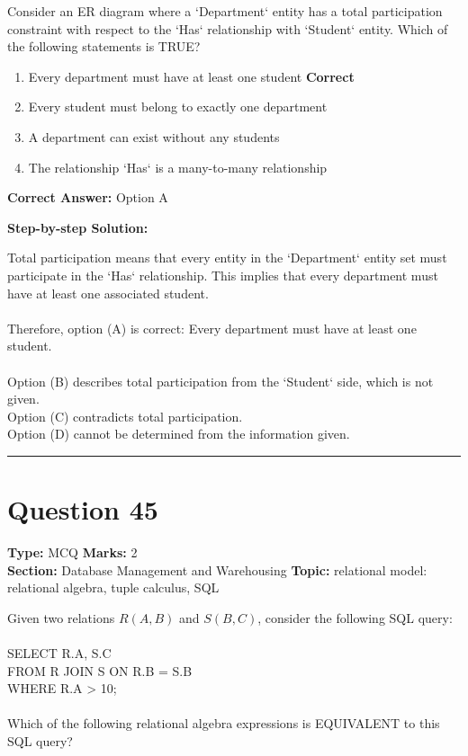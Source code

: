 \documentclass[11pt]{article}
\begin{document}
Consider an ER diagram where a `Department` entity has a total participation constraint with respect to the `Has` relationship with `Student` entity. Which of the following statements is TRUE?


\begin{enumerate}[label=\textbf{\Alph*.}, leftmargin=1.8em]
\item Every department must have at least one student \hfill {\color{gategreen}\textbf{Correct}}\item Every student must belong to exactly one department\item A department can exist without any students\item The relationship `Has` is a many-to-many relationship\end{enumerate}

\textbf{Correct Answer:} Option A

\textbf{Step-by-step Solution:}

Total participation means that every entity in the `Department` entity set must participate in the `Has` relationship. This implies that every department must have at least one associated student.\\
\\
Therefore, option (A) is correct: Every department must have at least one student.\\
\\
Option (B) describes total participation from the `Student` side, which is not given.\\
Option (C) contradicts total participation.\\
Option (D) cannot be determined from the information given.

\vspace{0.8em}
\hrule
\vspace{0.4em}
\section*{Question 45}
\textbf{Type:} MCQ \hfill \textbf{Marks:} 2\\
\textbf{Section:} Database Management and Warehousing \hfill \textbf{Topic:} relational model: relational algebra, tuple calculus, SQL

Given two relations \(R(A, B)\) and \(S(B, C)\), consider the following SQL query:\\
\\
SELECT R.A, S.C\\
FROM R JOIN S ON R.B = S.B\\
WHERE R.A > 10;\\
\\
Which of the following relational algebra expressions is EQUIVALENT to this SQL query?
\end{document}
